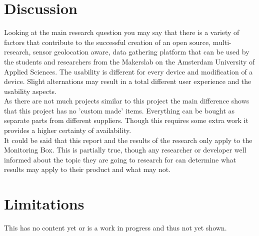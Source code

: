\documentclass[conference]{IEEEtran}
\begin{document}
\section{Discussion}
	Looking at the main research question you may say that there is a variety of factors that contribute to the successful creation of an open source, multi-research, sensor geolocation aware, data gathering platform that can be used by the students and researchers from the Makerslab on the Amsterdam University of Applied Sciences. The usability is different for every device and modification of a device. Slight alternations may result in a total different user experience and the usability aspects. \\
	As there are not much projects similar to this project the main difference shows that this project has no 'custom made' items. Everything can be bought as separate parts from different suppliers. Though this requires some extra work it provides a higher certainty of availability. \\
	It could be said that this report and the results of the research only apply to the Monitoring Box. This is partially true, though any researcher or developer well informed about the topic they are going to research for can determine what results may apply to their product and what may not.

\section{Limitations}
	This has no content yet or is a work in progress and thus not yet shown.



\end{document}
